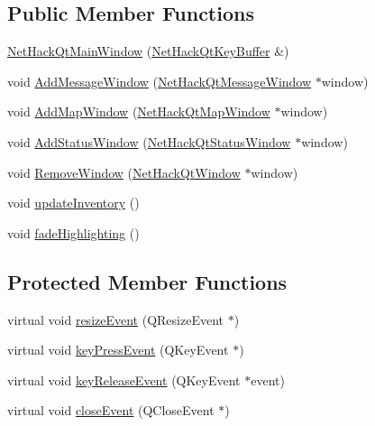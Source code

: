 \subsection*{Public Member Functions}
\begin{DoxyCompactItemize}
\item 
\hyperlink{classNetHackQtMainWindow_a37995824c274f1d7f2826fe7b29aa34d}{Net\+Hack\+Qt\+Main\+Window} (\hyperlink{classNetHackQtKeyBuffer}{Net\+Hack\+Qt\+Key\+Buffer} \&)
\item 
void \hyperlink{classNetHackQtMainWindow_a3e924bae65e640f153712dbec2e4f59d}{Add\+Message\+Window} (\hyperlink{classNetHackQtMessageWindow}{Net\+Hack\+Qt\+Message\+Window} $\ast$window)
\item 
void \hyperlink{classNetHackQtMainWindow_aeceb42630542cd6e86b0b45a40ac7654}{Add\+Map\+Window} (\hyperlink{classNetHackQtMapWindow}{Net\+Hack\+Qt\+Map\+Window} $\ast$window)
\item 
void \hyperlink{classNetHackQtMainWindow_adc63b2dc0d49798e026e9be30f219129}{Add\+Status\+Window} (\hyperlink{classNetHackQtStatusWindow}{Net\+Hack\+Qt\+Status\+Window} $\ast$window)
\item 
void \hyperlink{classNetHackQtMainWindow_a77c7cba1a2245479f229827f4600bf6b}{Remove\+Window} (\hyperlink{classNetHackQtWindow}{Net\+Hack\+Qt\+Window} $\ast$window)
\item 
void \hyperlink{classNetHackQtMainWindow_acebcb85c7b4395f8f79c7e92f13143a0}{update\+Inventory} ()
\item 
void \hyperlink{classNetHackQtMainWindow_a17d0dff2cf3519de5a55305eaaa6a0e3}{fade\+Highlighting} ()
\end{DoxyCompactItemize}
\subsection*{Protected Member Functions}
\begin{DoxyCompactItemize}
\item 
virtual void \hyperlink{classNetHackQtMainWindow_a292ae19774d7997cbcfca9157d6ab777}{resize\+Event} (Q\+Resize\+Event $\ast$)
\item 
virtual void \hyperlink{classNetHackQtMainWindow_a48b4bdf6e85946b31bfd1ce3d76b6a8a}{key\+Press\+Event} (Q\+Key\+Event $\ast$)
\item 
virtual void \hyperlink{classNetHackQtMainWindow_a86dac3e082c36222631fba1ba58fb833}{key\+Release\+Event} (Q\+Key\+Event $\ast$event)
\item 
virtual void \hyperlink{classNetHackQtMainWindow_a5f3186609e6405dc50089c67f78b0fbd}{close\+Event} (Q\+Close\+Event $\ast$)
\end{DoxyCompactItemize}
